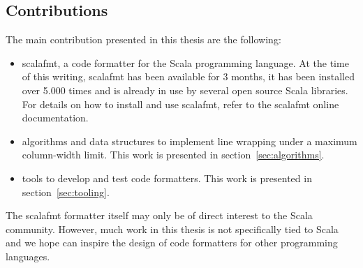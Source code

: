 \subsection{Contributions}
The main contribution presented in this thesis are the following:
\begin{itemize}
  \item scalafmt, a code formatter for the Scala programming language.
    At the time of this writing, scalafmt has been available for 3 months, it has been installed over 5.000 times and is already in use by several open source Scala libraries.
    For details on how to install and use scalafmt, refer to the scalafmt online documentation\autocite{geirsson_scalafmt_????}.

  \item algorithms and data structures to implement line wrapping under a maximum column-width limit.
    This work is presented in section~\ref{sec:algorithms}.
  \item tools to develop and test code formatters.
    This work is presented in section~\ref{sec:tooling}.
\end{itemize}
The scalafmt formatter itself may only be of direct interest to the Scala community.
However, much work in this thesis is not specifically tied to Scala and we hope can inspire the design of code formatters for other programming languages.

